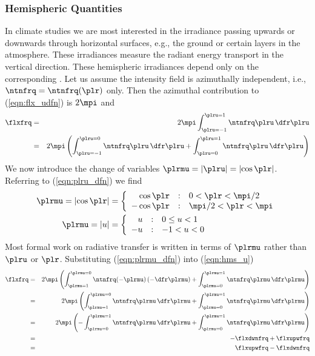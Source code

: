 \documentclass[12pt]{article}
\begin{document}
\subsubsection[Hemispheric Quantities]{Hemispheric Quantities}\label{sxn:flx_hms}
In climate studies we are most interested in the irradiance passing
upwards or downwards through horizontal surfaces, e.g., the ground or
certain layers in the atmosphere. 
These  irradiances measure the radiant energy
transport in the vertical direction.
These hemispheric irradiances depend only on the
corresponding .
Let us assume the intensity field is azimuthally independent, i.e., 
$\ntnfrq = \ntnfrq(\plr)$ only.
Then the azimuthal contribution to (\ref{eqn:flx_udfn}) is $2\mpi$ and
\begin{eqnarray}
\flxfrq & = & 2 \mpi \int_{\plru=-1}^{\plru=1} \ntnfrq \plru \,\dfr\plru \nonumber \\
& = & 2 \mpi \left( 
\int_{\plru=-1}^{\plru=0} \ntnfrq \plru \,\dfr\plru +
\int_{\plru=0}^{\plru=1} \ntnfrq \plru \,\dfr\plru \right)
\label{eqn:hms_u}
\end{eqnarray}
We now introduce the change of variables $\plrmu = |\plru| = |\!\cos
\plr|$. 
Referring to (\ref{eqn:plru_dfn}) we find
\begin{subequations}
\label{eqn:plrmu_dfn}
\begin{align}
\plrmu =  |\!\cos \plr | & = \left\{ 
\begin{array}{r@{\quad:\quad}ll}
\cos \plr & 0 < \plr < \mpi/2 \\
-\cos \plr & \mpi/2 < \plr <  \mpi
\end{array} \right. \\
\plrmu =  |u| & = \left\{ 
\begin{array}{r@{\quad:\quad}l}
 u & 0 \le u < 1 \\
-u & -1 < u < 0
\end{array} \right.
\end{align}
\end{subequations}
Most formal work on radiative transfer is written in terms of
$\plrmu$ rather than $\plru$ or $\plr$.
Substituting (\ref{eqn:plrmu_dfn}) into (\ref{eqn:hms_u})
\begin{eqnarray}
\flxfrq & = & 2 \mpi \left( 
\int_{\plrmu=1}^{\plrmu=0} \ntnfrq (-\plrmu) \, (-\dfr\plrmu) +
\int_{\plrmu=0}^{\plrmu=1} \ntnfrq \plrmu \,\dfr\plrmu \right) \nonumber \\
& = & 2 \mpi \left( 
\int_{\plrmu=1}^{\plrmu=0} \ntnfrq \plrmu \,\dfr\plrmu +
\int_{\plrmu=0}^{\plrmu=1} \ntnfrq \plrmu \,\dfr\plrmu \right) \nonumber \\
& = & 2 \mpi \left( 
-\int_{\plrmu=0}^{\plrmu=1} \ntnfrq \plrmu \,\dfr\plrmu +
\int_{\plrmu=0}^{\plrmu=1} \ntnfrq \plrmu \,\dfr\plrmu \right) \nonumber \\
& = & -\flxdwnfrq + \flxupwfrq \nonumber \\
& = & \flxupwfrq - \flxdwnfrq
\end{eqnarray}
\end{document}
